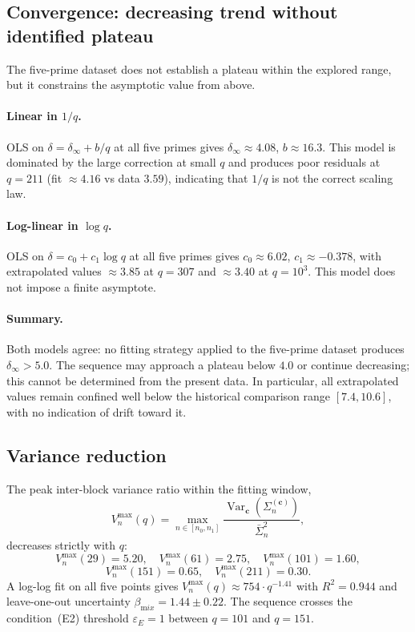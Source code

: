 \documentclass[11pt,a4paper]{article}
\theoremstyle{plain}
\theoremstyle{definition}
\DeclareMathOperator{\Var}{Var}
\begin{document}
  \subsection{Convergence: decreasing trend without identified plateau}

    The five-prime dataset does not establish a plateau within the explored range,
    but it constrains the asymptotic value from above.

    \paragraph{Linear in $1/q$.}
      OLS on $\delta = \delta_\infty + b/q$ at all five primes gives
      $\delta_\infty \approx 4.08$, $b \approx 16.3$.
      This model is dominated by the large correction at small $q$ and
      produces poor residuals at $q = 211$ (fit $\approx 4.16$ vs data $3.59$),
      indicating that $1/q$ is not the correct scaling law.

    \paragraph{Log-linear in $\log q$.}
      OLS on $\delta = c_0 + c_1 \log q$ at all five primes gives
      $c_0 \approx 6.02$, $c_1 \approx -0.378$, with extrapolated values
      $\approx 3.85$ at $q = 307$ and $\approx 3.40$ at $q = 10^3$.
      This model does not impose a finite asymptote.

    \paragraph{Summary.}
      Both models agree: no fitting strategy applied to the five-prime dataset
      produces $\delta_\infty > 5.0$.
      The sequence may approach a plateau below $4.0$ or continue decreasing;
      this cannot be determined from the present data.
      In particular, all extrapolated values remain confined well below the
      historical comparison range $[7.4, 10.6]$, with no indication of drift
      toward it.

  \subsection{Variance reduction}
  \label{sec:variance}

  The peak inter-block variance ratio within the fitting window,
  \[
    V_n^{\max}(q) = \max_{n \in [n_0, n_1]}
    \frac{\Var_{\mathbf{c}}(\Sigma_n^{(\mathbf{c})})}{\bar\Sigma_n^2},
  \]
  decreases strictly with $q$:
  \[
    V_n^{\max}(29) = 5.20, \quad
    V_n^{\max}(61) = 2.75, \quad
    V_n^{\max}(101) = 1.60,
  \]
  \[
    V_n^{\max}(151) = 0.65, \quad
    V_n^{\max}(211) = 0.30.
  \]
  A log-log fit on all five points gives
  $V_n^{\max}(q) \approx 754 \cdot q^{-1.41}$
  with $R^2 = 0.944$ and leave-one-out uncertainty
  $\beta_{\mathrm mix} = 1.44 \pm 0.22$.
  The sequence crosses the condition~(E2) threshold $\varepsilon_E = 1$
  between $q = 101$ and $q = 151$.
\end{document}
